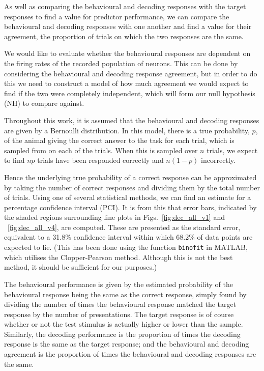 As well as comparing the behavioural and decoding responses with the target responses to find a value for predictor performance, we can compare the behavioural and decoding responses with one another and find a value for their agreement, the proportion of trials on which the two responses are the same.

We would like to evaluate whether the behavioural responses are dependent on the firing rates of the recorded population of neurons.
This can be done by considering the behavioural and decoding response agreement, but in order to do this we need to construct a model of how much agreement we would expect to find if the two were completely independent, which will form our null hypothesis (NH) to compare against.

Throughout this work, it is assumed that the behavioural and decoding responses are given by a Bernoulli distribution.
In this model, there is a true probability, $p$, of the animal giving the correct answer to the task for each trial, which is sampled from on each of the trials.
When this is sampled over $n$ trials, we expect to find $np$ trials have been responded correctly and $n(1-p)$ incorrectly.

Hence the underlying true probability of a correct response can be approximated by taking the number of correct responses and dividing them by the total number of trials.
Using one of several statistical methods, we can find an estimate for a percentage confidence interval (PCI).
It is from this that error bars, indicated by the shaded regions surrounding line plots in Figs.~\ref{fig:dec_all_v1} and ~\ref{fig:dec_all_v4}, are computed.
These are presented as the standard error, equivalent to a 31.8\%  confidence interval within which 68.2\% of data points are expected to lie.
(This has been done using the function \texttt{binofit} in MATLAB, which utilises the Clopper-Pearson method.
Although this is not the best method, it should be sufficient for our purposes.)

The behavioural performance is given by the estimated probability of the behavioural response being the same as the correct response, simply found by dividing the number of times the behavioural response matched the target response by the number of presentations.
The target response is of course whether or not the test stimulus is actually higher or lower than the sample.
Similarly, the decoding performance is the proportion of times the decoding response is the same as the target response; and the behavioural and decoding agreement is the proportion of times the behavioural and decoding responses are the same.

